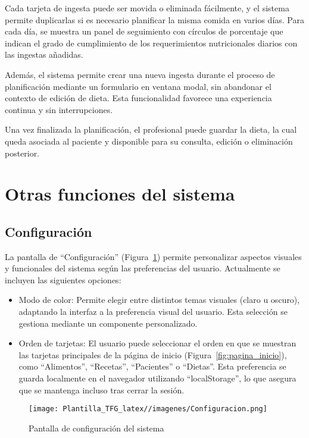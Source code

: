 Cada tarjeta de ingesta puede ser movida o eliminada fácilmente, y el sistema permite duplicarlas si es necesario planificar la misma comida en varios días. Para cada día, se muestra un panel de seguimiento con círculos de porcentaje que indican el grado de cumplimiento de los requerimientos nutricionales diarios con las ingestas añadidas.

Además, el sistema permite crear una nueva ingesta durante el proceso de planificación mediante un formulario en ventana modal, sin abandonar el contexto de edición de dieta. Esta funcionalidad favorece una experiencia continua y sin interrupciones.

Una vez finalizada la planificación, el profesional puede guardar la dieta, la cual queda asociada al paciente y disponible para su consulta, edición o eliminación posterior.

\section{Otras funciones del sistema}

\subsection{Configuración}
La pantalla de ``Configuración'' (Figura~\ref{fig:pantalla-configuracion}) permite personalizar aspectos visuales y funcionales del sistema según las preferencias del usuario. Actualmente se incluyen las siguientes opciones:

\begin{itemize}
    \item Modo de color: Permite elegir entre distintos temas visuales (claro u oscuro), adaptando la interfaz a la preferencia visual del usuario. Esta selección se gestiona mediante un componente personalizado.
    
    \item Orden de tarjetas: El usuario puede seleccionar el orden en que se muestran las tarjetas principales de la página de inicio (Figura~\ref{fig:pagina_inicio}), como ``Alimentos'', ``Recetas'', ``Pacientes'' o ``Dietas''. Esta preferencia se guarda localmente en el navegador utilizando ``localStorage'', lo que asegura que se mantenga incluso tras cerrar la sesión.
\end{itemize}

\begin{figure}[t]
    \centering
    \texttt{[image: Plantilla\_TFG\_latex//imagenes/Configuracion.png]}
    \caption{Pantalla de configuración del sistema}
    \label{fig:pantalla-configuracion}
\end{figure}

